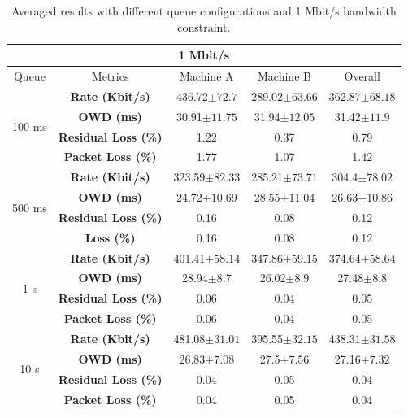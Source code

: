 \begin{table}[h]
\begin{center}
\begin{tabular}{ |c|c|c|c|c| }
\hline
\multicolumn{5}{|c|}{\textbf{1 Mbit/s}} \\ \hline
 Queue & Metrics & Machine A & Machine B & Overall\\ \hline
\multirow{4}{*}{100 ms} & \textbf{Rate (Kbit/s)} & 436.72$\pm72.7$ & 289.02$\pm63.66$ & 362.87$\pm68.18$\\ \cline{2-5}
 & \textbf{OWD (ms)} &  30.91$\pm11.75$ & 31.94$\pm12.05$ & 31.42$\pm11.9$ \\ \cline{2-5}
 & \textbf{Residual Loss (\%)} & 1.22 & 0.37 & 0.79 \\ \cline{2-5}
 & \textbf{Packet Loss (\%)} & 1.77 & 1.07 & 1.42 \\ \hline
\multirow{4}{*}{500 ms} & \textbf{Rate (Kbit/s)} & 323.59$\pm82.33$ & 285.21$\pm73.71$ & 304.4$\pm78.02$\\ \cline{2-5}
 & \textbf{OWD (ms)} & 24.72$\pm10.69$ & 28.55$\pm11.04$ & 26.63$\pm10.86$ \\ \cline{2-5}
 & \textbf{Residual Loss (\%)} & 0.16 & 0.08 & 0.12 \\ \cline{2-5}
 & \textbf{Loss (\%)} & 0.16 & 0.08 & 0.12 \\ \hline
\multirow{4}{*}{1 s} & \textbf{Rate (Kbit/s)} & 401.41$\pm58.14$ & 347.86$\pm59.15$ & 374.64$\pm58.64$\\ \cline{2-5}
 & \textbf{OWD (ms)} & 28.94$\pm8.7$ & 26.02$\pm8.9$ & 27.48$\pm8.8$ \\ \cline{2-5}
 & \textbf{Residual Loss (\%)} & 0.06 & 0.04 & 0.05 \\ \cline{2-5}
 & \textbf{Packet Loss (\%)} & 0.06 & 0.04 & 0.05 \\ \hline
\multirow{4}{*}{10 s} & \textbf{Rate (Kbit/s)} & 481.08$\pm31.01$ & 395.55$\pm32.15$ & 438.31$\pm31.58$\\ \cline{2-5}
 & \textbf{OWD (ms)} & 26.83$\pm7.08$ & 27.5$\pm7.56$ & 27.16$\pm7.32$ \\ \cline{2-5}
 & \textbf{Residual Loss (\%)} & 0.04 & 0.05 & 0.04 \\ \cline{2-5}
 & \textbf{Packet Loss (\%)} & 0.04 & 0.05 & 0.04 \\ \hline
\end{tabular}
    \caption[Averaged results with different queue configurations and 1 Mbit/s bandwidth constraint]{Averaged results with different queue configurations and 1 Mbit/s bandwidth constraint.}
    \label{fig:1mbit_queue}
\end{center}
\end{table}

